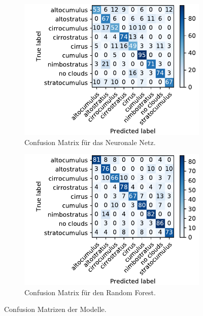 \begin{figure}
  \centering
  \begin{subfigure}[t]{0.48\textwidth}
    \centering
    \includegraphics[width=\textwidth]{content/conf_nn.pdf}
    \caption{Confusion Matrix für das Neuronale Netz.}%
    \label{fig:conf_nn}
  \end{subfigure}
  \begin{subfigure}[t]{0.48\textwidth}
    \centering
    \includegraphics[width=\textwidth]{content/conf_rf.pdf}
    \caption{Confusion Matrix für den Random Forest.}%
    \label{fig:conf_rf}
  \end{subfigure}
  \caption{Confusion Matrizen der Modelle.}%
  \label{fig:conf_mat}
\end{figure}


